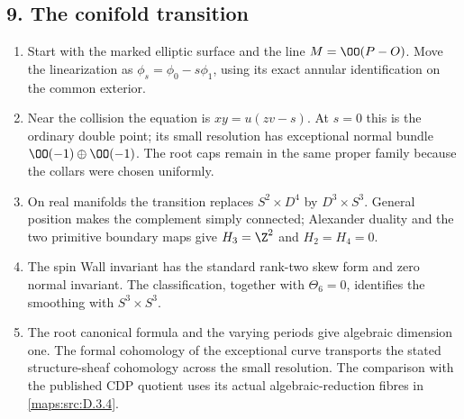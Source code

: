 \subsection*{9. The conifold transition}
\RungOne
\begin{enumerate}[label=\arabic*.,leftmargin=*]
\item Start with the marked elliptic surface and the line
$M=\OO(P-O)$.  Move the linearization as $\phi_s=\phi_0-s\phi_1$,
using its exact annular identification on the common exterior.
\item Near the collision the equation is
$xy=u(zv-s)$.  At $s=0$ this is the ordinary double point;
its small resolution has exceptional normal bundle
$\OO(-1)\oplus\OO(-1)$.  The root caps remain in the same
proper family because the collars were chosen uniformly.
\item On real manifolds the transition replaces $S^2\times D^4$
by $D^3\times S^3$.  General position makes the complement
simply connected; Alexander duality and the two primitive boundary
maps give $H_3=\Z^2$ and $H_2=H_4=0$.
\item The spin Wall invariant has the standard rank-two skew form
and zero normal invariant.  The classification, together with
$\Theta_6=0$, identifies the smoothing with $S^3\times S^3$.
\item The root canonical formula and the varying periods give
algebraic dimension one.  The formal cohomology of the exceptional
curve transports the stated structure-sheaf cohomology across the
small resolution.  The comparison with the published CDP quotient
uses its actual algebraic-reduction fibres in
\cref{maps:src:D.3.4}.
\end{enumerate}

